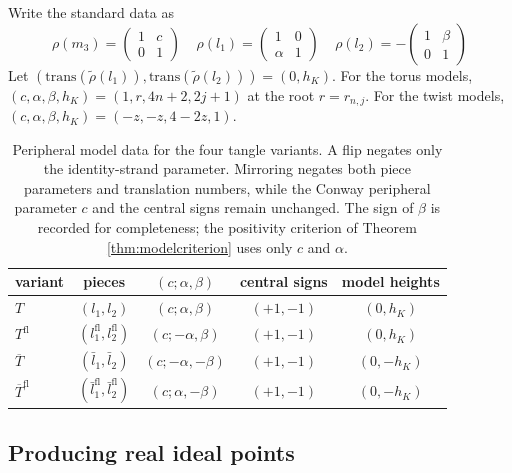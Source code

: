 \documentclass{article}
\theoremstyle{plain}
\theoremstyle{definition}
\theoremstyle{plain}
\theoremstyle{plain}
\theoremstyle{plain}
\theoremstyle{remark}
\theoremstyle{remark}
\theoremstyle{plain}
\theoremstyle{plain}
\newcounter{main}
\theoremstyle{plain}
\theoremstyle{plain}
\begin{document}
\medskip

Write the standard data as
\begin{equation*}
	\rho(m_3) = \begin{pmatrix}1&c\\0&1\end{pmatrix} \ \ \ \ \ \rho(l_1) = \begin{pmatrix}1&0 \\ \alpha&1\end{pmatrix} \ \ \ \ \ \rho(l_2) = -\begin{pmatrix}1&\beta \\ 0 & 1\end{pmatrix}
\end{equation*}
Let $(\mathrm{trans}(\widetilde\rho(l_1)), \mathrm{trans}(\widetilde\rho(l_2))) = (0, h_K)$. For the torus models, $(c, \alpha, \beta, h_K) = (1, r, 4n+2, 2j+1)$ at the root $r = r_{n,j}$. For the twist models, $(c, \alpha, \beta, h_K) = (-z, -z, 4-2z, 1)$. 

\begin{table}[H]
	\centering
	\begin{tabular}{lcccc}
		\toprule
		variant
		& pieces
		& $(c;\alpha,\beta)$
		& central signs
		& model heights\\
		\midrule
		$T$
		& $(l_1,l_2)$
		& $(c;\alpha,\beta)$
		& $(+1,-1)$
		& $(0,h_K)$\\
		$T^{\mathrm{fl}}$
		& $(l_1^{\mathrm{fl}},l_2^{\mathrm{fl}})$
		& $(c;-\alpha,\beta)$
		& $(+1,-1)$
		& $(0,h_K)$\\
		$\overline T$
		& $(\bar l_1,\bar l_2)$
		& $(c;-\alpha,-\beta)$
		& $(+1,-1)$
		& $(0,-h_K)$\\
		$\overline T^{\mathrm{fl}}$
		& $(\bar l_1^{\mathrm{fl}},
		\bar l_2^{\mathrm{fl}})$
		& $(c;\alpha,-\beta)$
		& $(+1,-1)$
		& $(0,-h_K)$\\
		\bottomrule
	\end{tabular}
	\caption{Peripheral model data for the four tangle variants. A flip negates only the identity-strand parameter. Mirroring negates both piece parameters and translation numbers, while the Conway peripheral parameter $c$ and the central signs remain unchanged. The sign of $\beta$ is recorded for completeness; the positivity criterion of Theorem \ref{thm:modelcriterion} uses only $c$ and $\alpha$.}
	\label{tab:decorations}
\end{table}

\subsection{Producing real ideal points}
\end{document}
